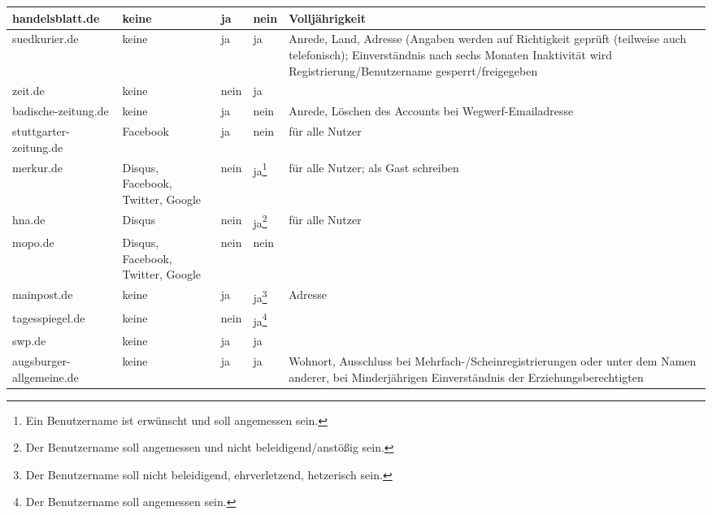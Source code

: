 \begin{landscape}
\begin{longtable}{lp{28mm}p{20mm}p{20mm}p{90mm}}
handelsblatt.de %
& keine
& ja
& nein
& Volljährigkeit
\\\midrule

suedkurier.de %
& keine
& ja
& ja
& Anrede, Land, Adresse (Angaben werden auf Richtigkeit geprüft (teilweise auch
  telefonisch); Einverständnis nach sechs Monaten Inaktivität wird
  Registrierung/Benutzername gesperrt/freigegeben
\\\midrule

zeit.de %
& keine
& nein
& ja
&
\\\midrule

badische-zeitung.de %
& keine
& ja
& nein
& Anrede, Löschen des Accounts bei Wegwerf-Emailadresse
\\\midrule

stuttgarter-zeitung.de %
& Facebook
& ja
& nein
&für alle Nutzer
\\\midrule

merkur.de %
& Disqus, Facebook, Twitter, Google
& nein
& ja\footnote{Ein Benutzername ist erwünscht und soll angemessen sein.}
& für alle Nutzer; als Gast schreiben
\\\midrule

hna.de %
& Disqus
& nein
& ja\footnote{Der Benutzername soll angemessen und nicht beleidigend/anstößig
  sein.}
&für alle Nutzer
\\\midrule

mopo.de %
& Disqus, Facebook, Twitter, Google
& nein
& nein
&
\\\midrule

mainpost.de %
& keine
& ja
& ja\footnote{Der Benutzername soll nicht beleidigend, ehrverletzend, hetzerisch
  sein.}
& Adresse
\\\midrule

tagesspiegel.de %
& keine
& nein
& ja\footnote{Der Benutzername soll angemessen sein.}
&
\\\midrule

swp.de %
& keine
& ja
& ja
&
\\\midrule

augsburger-allgemeine.de %
& keine
& ja
& ja
& Wohnort, Ausschluss bei Mehrfach-/Scheinregistrierungen oder unter dem Namen
  anderer, bei Minderjährigen Einverständnis der Erziehungsberechtigten

\end{longtable}
\end{landscape}

